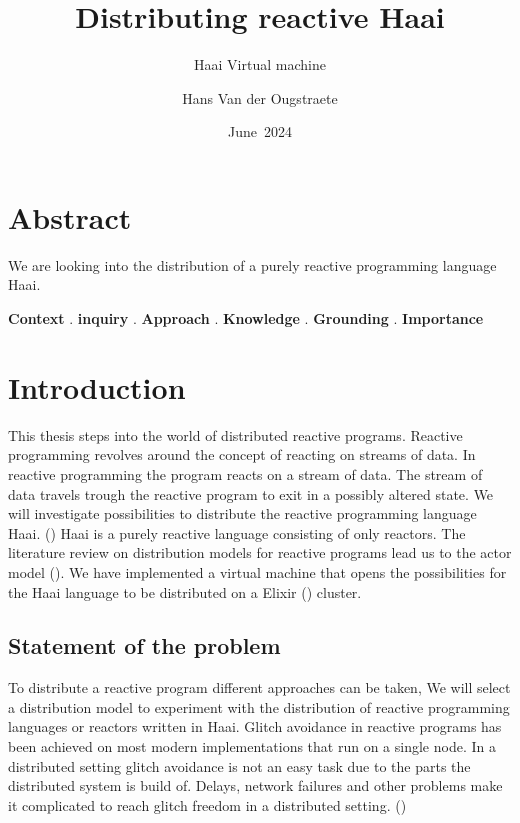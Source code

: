 \documentclass[a4paper]{book}
\title{Distributing reactive Haai}
\subtitle{Haai Virtual machine}
\author{Hans Van der Ougstraete}
\date{June~2024}
\begin{document}
\frontmatter
\maketitle%


\chapter{Abstract}
We are looking into the distribution of a purely reactive programming language Haai. 

\textbf{Context}
.
\textbf{inquiry}
.
\textbf{Approach}
.
\textbf{Knowledge}
.
\textbf{Grounding}
.
\textbf{Importance}



\tableofcontents%

\mainmatter%
\chapter{Introduction}
This thesis steps into the world of distributed reactive programs. Reactive programming revolves around the concept of reacting on streams of data. In reactive programming the program reacts on a stream of data. The stream of data travels trough the reactive program to exit in a possibly altered state. We will investigate possibilities to distribute the reactive programming language Haai. (\cite{oeyen_reactive_2024}) Haai is a purely reactive language consisting of only reactors. The literature review on distribution models for reactive programs lead us to the actor model (\cite{de_koster_43_2016}). We have implemented a virtual machine that opens the possibilities for the Haai language to be distributed on a Elixir (\cite{juric2024elixir}) cluster.
\section{Statement of the problem}
To distribute a reactive program different approaches can be taken, We will select a distribution model to experiment with the distribution of reactive programming languages or reactors written in Haai. Glitch avoidance in reactive programs has been achieved on most modern implementations that run on a single node. In a distributed setting glitch avoidance is not an easy task due to the parts the distributed system is build of. Delays, network failures and other problems make it complicated to reach glitch freedom in a distributed setting. (\cite{DBLP:journals/csur/BainomugishaCCMM13})
\end{document}
